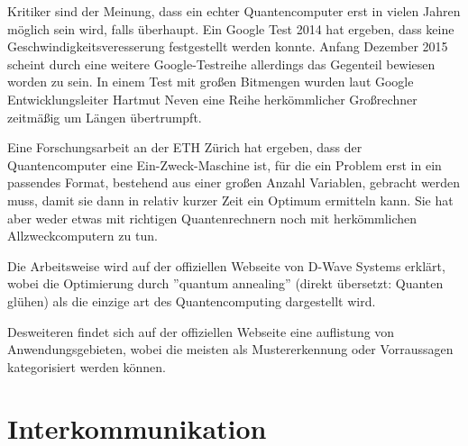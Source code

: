 Kritiker sind der Meinung, dass ein echter Quantencomputer erst in vielen Jahren möglich sein wird, falls überhaupt. Ein Google Test 2014 hat ergeben, dass keine Geschwindigkeitsveresserung festgestellt werden konnte. Anfang Dezember 2015 scheint durch eine weitere Google-Testreihe allerdings das Gegenteil bewiesen worden zu sein. In einem Test mit großen Bitmengen wurden laut Google Entwicklungsleiter Hartmut Neven eine Reihe herkömmlicher Großrechner zeitmäßig um Längen übertrumpft.


Eine Forschungsarbeit an der ETH Zürich hat ergeben, dass der Quantencomputer eine Ein-Zweck-Maschine ist, für die ein Problem erst in ein passendes Format, bestehend aus einer großen Anzahl Variablen, gebracht werden muss, damit sie dann in relativ kurzer Zeit ein Optimum ermitteln kann. Sie hat aber weder etwas mit richtigen Quantenrechnern noch mit herkömmlichen Allzweckcomputern zu tun.


Die Arbeitsweise wird auf der offiziellen Webseite von D-Wave Systems erklärt, wobei die Optimierung durch ''quantum annealing'' (direkt übersetzt: Quanten glühen) als die einzige art des Quantencomputing dargestellt wird.


Desweiteren findet sich auf der offiziellen Webseite eine auflistung von Anwendungsgebieten, wobei die meisten als Mustererkennung oder Vorraussagen kategorisiert werden können.











\section{Interkommunikation}
\label{sec:interkommunikation}

